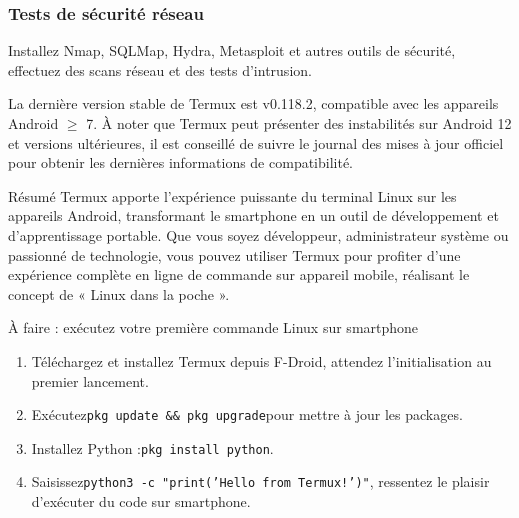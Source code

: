 \subsubsection*{Tests de sécurité réseau}

Installez Nmap, SQLMap, Hydra, Metasploit et autres outils de sécurité, effectuez des scans réseau et des tests d'intrusion.


La dernière version stable de Termux est v0.118.2, compatible avec les appareils Android $\geq$ 7. À noter que Termux peut présenter des instabilités sur Android 12 et versions ultérieures, il est conseillé de suivre le journal des mises à jour officiel pour obtenir les dernières informations de compatibilité.

\begin{tcbinfo}{Résumé}
Termux apporte l'expérience puissante du terminal Linux sur les appareils Android, transformant le smartphone en un outil de développement et d'apprentissage portable. Que vous soyez développeur, administrateur système ou passionné de technologie, vous pouvez utiliser Termux pour profiter d'une expérience complète en ligne de commande sur appareil mobile, réalisant le concept de « Linux dans la poche ».

\end{tcbinfo}

\begin{tcbpractice}{À faire : exécutez votre première commande Linux sur smartphone}
\begin{enumerate}
  \item Téléchargez et installez Termux depuis F-Droid, attendez l'initialisation au premier lancement.
  \item Exécutez\texttt{pkg update \&\& pkg upgrade}pour mettre à jour les packages.
  \item Installez Python :\texttt{pkg install python}.
  \item Saisissez\texttt{python3 -\allowbreak c "print('Hello from Termux!')"}, ressentez le plaisir d'exécuter du code sur smartphone.
\end{enumerate}

\end{tcbpractice}
